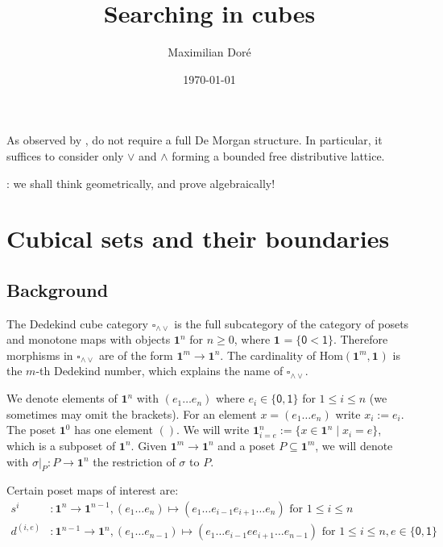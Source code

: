 \documentclass[11pt]{article}
\title{Searching in cubes}
\author{Maximilian Dor\'e}
\date{\today}
\theoremstyle{definition}
\newcommand{\mdef}{:=}
\newcommand{\join}{\wedge}
\newcommand{\meet}{\vee}
\newcommand{\dedekind}{\square_{\join \meet}}
\newcommand{\pint}[1]{\mathbf{1}^{#1}}
\newcommand{\pintrestr}[3]{\mathbf{1}^{#1}_{{#2}={#3}}}
\newcommand{\izero}{\mathsf{0}}
\newcommand{\ione}{\mathsf{1}}
\newcommand{\restrict}[2]{{#1}|_{#2}}
\renewcommand{\hom}[2]{\text{Hom}({#1} , {#2})}
\begin{document}
\maketitle	

As observed by \cite{orton17_axiom_model_cubic_type_theor_topos}, do not require
a full De Morgan structure. In particular, it suffices to consider only $\meet$
and $\join$ forming a bounded free distributive lattice.

\cite{williamson12_combin_homot_theor}: we shall think geometrically, and prove
algebraically!



\section{Cubical sets and their boundaries}

\subsection{Background}

The Dedekind cube category $\dedekind$ is the full subcategory of the category
of posets and monotone maps with objects $\pint{n}$ for $n \geq 0$, where $\pint{}
= \{ \izero < \ione \}$. Therefore morphisms in $\dedekind$ are of
the form $\pint{m} \to \pint{n}$. The cardinality of $\hom{\pint{m}}{\pint{}}$ is the
$m$-th Dedekind number, which explains the name of $\dedekind$.

We denote elements of $\pint{n}$ with $(e_1 \ldots e_n)$ where $e_i \in
\{\izero, \ione\}$ for $1 \leq i \leq n$ (we sometimes may omit the brackets).
For an element $x = (e_1 \ldots e_n)$ write $x_i \mdef e_i$. The poset
$\pint{0}$ has one element $()$. We will write $\pintrestr{n}{i}{e} \mdef
\{ x \in \pint{n} \mid x_i = e \}$, which is a subposet of $\pint{n}$. Given
$\pint{m} \to \pint{n}$ and a poset $P \subseteq \pint{m}$, we will denote with
$\restrict{\sigma}{P} : P \to \pint{n}$ the restriction of $\sigma$ to $P$.

Certain poset maps of interest are:
\begin{align*}
  s^i &: \pint{n} \to \pint{n-1}, (e_1 \ldots e_n) \mapsto (e_1 \ldots e_{i-1} e_{i+1} \ldots e_n) \text{ for } 1 \leq i \leq n\\
  d^{(i,e)} &: \pint{n-1} \to \pint{n}, 
      (e_1 \ldots e_{n-1}) \mapsto (e_1 \ldots e_{i-1} e e_{i+1} \ldots e_{n-1}) \text{ for } 1 \leq i \leq n, e \in \{\izero,\ione\}
\end{align*}
\end{document}
